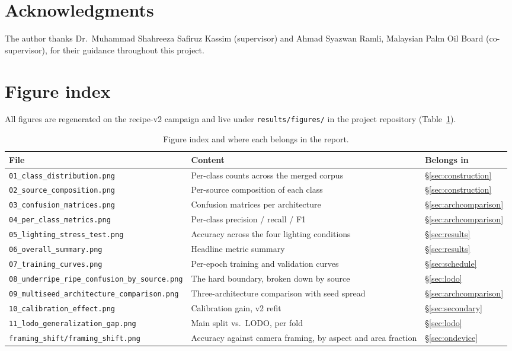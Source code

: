 \documentclass{article}
\begin{document}
\section*{Acknowledgments}
The author thanks Dr.\ Muhammad Shahreeza Safiruz Kassim (supervisor) and Ahmad Syazwan Ramli, Malaysian
Palm Oil Board (co-supervisor), for their guidance throughout this project.




\appendix

\section{Figure index}

All figures are regenerated on the recipe-v2 campaign and live under \texttt{results/figures/} in the
project repository (Table~\ref{tab:figindex}).

\begin{table}[h]
\centering
\caption{Figure index and where each belongs in the report.}
\label{tab:figindex}
\begin{tabular}{@{}p{4.6cm}p{6.8cm}p{2cm}@{}}
\toprule
File & Content & Belongs in \\
\midrule
\texttt{01\_class\_distribution.png} & Per-class counts across the merged corpus & \S\ref{sec:construction} \\
\texttt{02\_source\_composition.png} & Per-source composition of each class & \S\ref{sec:construction} \\
\texttt{03\_confusion\_matrices.png} & Confusion matrices per architecture & \S\ref{sec:archcomparison} \\
\texttt{04\_per\_class\_metrics.png} & Per-class precision / recall / F1 & \S\ref{sec:archcomparison} \\
\texttt{05\_lighting\_stress\_test.png} & Accuracy across the four lighting conditions & \S\ref{sec:results} \\
\texttt{06\_overall\_summary.png} & Headline metric summary & \S\ref{sec:results} \\
\texttt{07\_training\_curves.png} & Per-epoch training and validation curves & \S\ref{sec:schedule} \\
\texttt{08\_underripe\_ripe\_confusion\_by\_source.png} & The hard boundary, broken down by source & \S\ref{sec:lodo} \\
\texttt{09\_multiseed\_architecture\_comparison.png} & Three-architecture comparison with seed spread & \S\ref{sec:archcomparison} \\
\texttt{10\_calibration\_effect.png} & Calibration gain, v2 refit & \S\ref{sec:secondary} \\
\texttt{11\_lodo\_generalization\_gap.png} & Main split vs.\ LODO, per fold & \S\ref{sec:lodo} \\
\texttt{framing\_shift/framing\_shift.png} & Accuracy against camera framing, by aspect and area fraction & \S\ref{sec:ondevice} \\
\bottomrule
\end{tabular}
\end{table}
\end{document}
